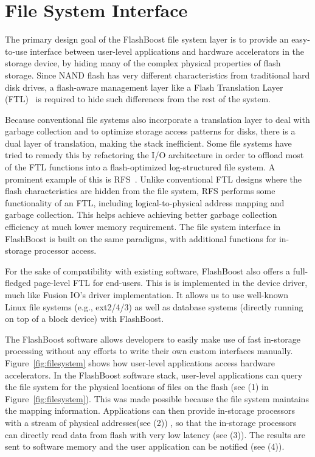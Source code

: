 \section{File System Interface}
\label{sec:software}

The primary design goal of the FlashBoost file system layer is to provide an
easy-to-use interface between user-level applications and hardware accelerators
in the storage device, by hiding many of the complex physical properties of
flash storage. Since NAND flash has very different characteristics from
traditional hard disk drives, a flash-aware management layer like a Flash
Translation Layer (FTL)~\cite{} is required to hide such differences from the
rest of the system.

Because conventional file systems also incorporate a translation layer to deal
with garbage collection and to optimize storage access patterns for disks, there
is a dual layer of translation, making the stack inefficient. Some file systems
have tried to remedy this by refactoring the I/O architecture in order to
offload most of the FTL functions into a flash-optimized log-structured file
system. A prominent example of this is RFS~\cite{rfs}. 
Unlike conventional FTL designs where the flash characteristics are
hidden from the file system, RFS performs some functionality of an FTL,
including logical-to-physical address mapping and garbage collection.
This helps achieve achieving better garbage collection
efficiency at much lower memory requirement. 
The file system interface in FlashBoost is built on the same paradigms, with
additional functions for in-storage processor access.

For the sake of compatibility with existing software, FlashBoost also offers a
full-fledged page-level FTL for end-users. This is is implemented in the device
driver, much like Fusion IO’s driver implementation. It allows us to use
well-known Linux file systems (e.g., ext2/4/3) as well as database systems
(directly running on top of a block device) with FlashBoost.

The FlashBoost software allows developers to easily make use of fast in-storage
processing without any efforts to write their own custom interfaces manually.
Figure~\ref{fig:filesystem} shows how user-level applications access hardware
accelerators.  In the FlashBoost software stack, user-level applications can
query the file system for the physical locations of files on the flash (see (1)
in Figure~\ref{fig:filesystem}). This was made possible because the file system
maintains the mapping information.  Applications can then provide in-storage
processors with a stream of physical addresses(see (2))
, so that the in-storage processors can directly read
data from flash with very low latency (see (3)).
The results are sent to software memory and the user application can be notified
(see (4)).


